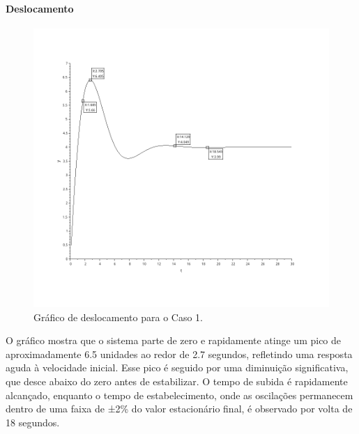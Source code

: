 \paragraph{Deslocamento}
\begin{figure}[H]
    \centering
    \includegraphics[height=0.7\textwidth]{final/2-atividade/assets/deslocamento-caso-1.png}
    \caption{Gráfico de deslocamento para o Caso 1.}
\end{figure}
O gráfico mostra que o sistema parte de zero e rapidamente atinge um pico de aproximadamente 6.5 unidades ao redor de 2.7 segundos, refletindo uma resposta aguda à velocidade inicial. Esse pico é seguido por uma diminuição significativa, que desce abaixo do zero antes de estabilizar. O tempo de subida é rapidamente alcançado, enquanto o tempo de estabelecimento, onde as oscilações permanecem dentro de uma faixa de ±2\% do valor estacionário final, é observado por volta de 18 segundos.


